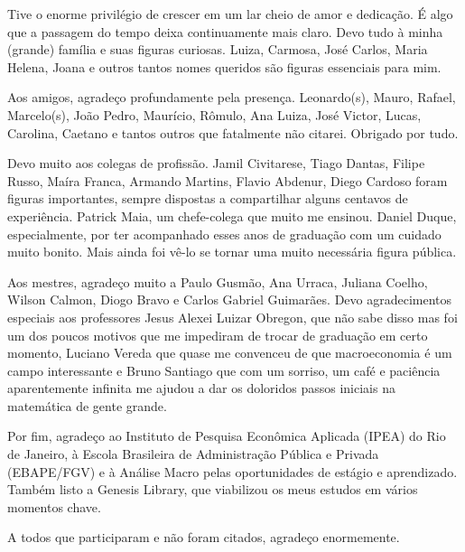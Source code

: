 
\begin{agradecimentos}

Tive o enorme privilégio de crescer em um lar cheio de amor e dedicação. É algo que a passagem do tempo deixa continuamente mais claro. Devo tudo à minha (grande) família e suas figuras curiosas. Luiza, Carmosa, José Carlos, Maria Helena, Joana e outros tantos nomes queridos são figuras essenciais para mim.

Aos amigos, agradeço profundamente pela presença. Leonardo(s), Mauro, Rafael, Marcelo(s), João Pedro, Maurício, Rômulo, Ana Luiza, José Victor, Lucas, Carolina, Caetano e tantos outros que fatalmente não citarei. Obrigado por tudo.

Devo muito aos colegas de profissão. Jamil Civitarese, Tiago Dantas, Filipe Russo, Maíra Franca, Armando Martins, Flavio Abdenur, Diego Cardoso foram figuras importantes, sempre dispostas a compartilhar alguns centavos de experiência. Patrick Maia, um chefe-colega que muito me ensinou. Daniel Duque, especialmente, por ter acompanhado esses anos de graduação com um cuidado muito bonito. Mais ainda foi vê-lo se tornar uma muito necessária figura pública.

Aos mestres, agradeço muito a Paulo Gusmão, Ana Urraca, Juliana Coelho, Wilson Calmon, Diogo Bravo e Carlos Gabriel Guimarães. Devo agradecimentos especiais aos professores Jesus Alexei Luizar Obregon, que não sabe disso mas foi um dos poucos motivos que me impediram de trocar de graduação em certo momento, Luciano Vereda que quase me convenceu de que macroeconomia é um campo interessante e Bruno Santiago que com um sorriso, um café e paciência aparentemente infinita me ajudou a dar os doloridos passos iniciais na matemática de gente grande.

Por fim, agradeço ao Instituto de Pesquisa Econômica Aplicada (IPEA) do Rio de Janeiro, à Escola Brasileira de Administração Pública e Privada (EBAPE/FGV) e à Análise Macro pelas oportunidades de estágio e aprendizado. Também listo a Genesis Library, que viabilizou os meus estudos em vários momentos chave. 

A todos que participaram e não foram citados, agradeço enormemente. 





\end{agradecimentos}